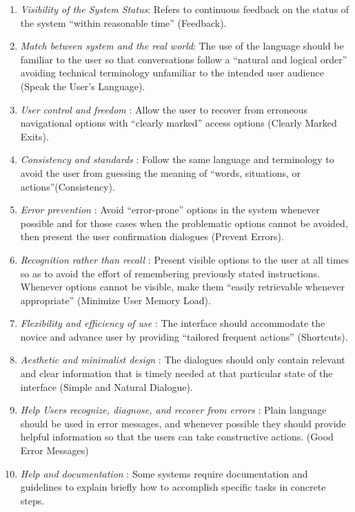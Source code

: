 \documentclass[twocolumn]{bmcart}%
\begin{document}
\begin{enumerate}
\item \textit{Visibility of the System Status}: Refers to continuous feedback on the status of the system ``within reasonable time'' (Feedback).
\item \textit{Match between system and the real world}: The use of the language should be familiar to the user so that conversations follow a ``natural and logical order'' avoiding technical terminology unfamiliar to the intended user audience (Speak the User's Language).
\item \textit{User control and freedom} : Allow the user to recover from erroneous navigational options with ``clearly marked'' access options (Clearly Marked Exits).
\item \textit{Consistency and standards} : Follow the same language and terminology to avoid the user from guessing the meaning of ``words, situations, or actions''(Consistency).
\item \textit{Error prevention} : Avoid ``error-prone'' options in the system whenever possible and for those cases when the problematic options cannot be avoided, then present the user confirmation dialogues (Prevent Errors).
\item \textit{Recognition rather than recall} : Present visible options to the user at all times so as to avoid the effort of remembering previously stated instructions. Whenever options cannot be visible, make them ``easily retrievable whenever appropriate'' (Minimize User Memory Load).
\item \textit{Flexibility and efficiency of use} : The interface should accommodate the novice and advance user by providing ``tailored frequent actions'' (Shortcuts).
\item \textit{Aesthetic and minimalist design} : The dialogues should only contain relevant and clear information that is timely needed at that particular state of the interface (Simple and Natural Dialogue).
\item \textit{Help Users recognize, diagnose, and recover from errors} : Plain language should be used in error messages, and whenever possible they should provide helpful information so that the users can take constructive actions. (Good Error Messages)
\item \textit{Help and documentation} : Some systems require documentation and guidelines to explain briefly how to accomplish specific tasks in concrete steps.
\end{enumerate}
\end{document}
